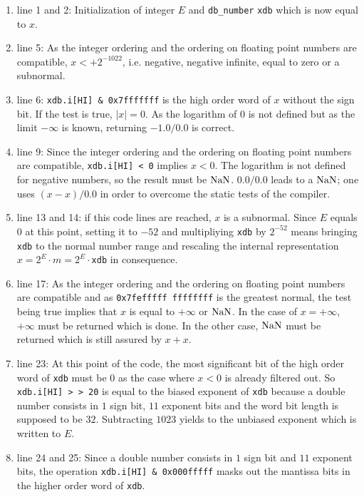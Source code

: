 {\renewcommand{\labelenumi}{}
\begin{enumerate}
\item line 1 and 2: Initialization of integer $E$ and {\tt db\_number} {\tt xdb} which is now equal to $x$.
\item line 5: As the integer ordering and the ordering on floating point numbers are compatible, 
$x < +2^{-1022}$, i.e. negative, negative infinite, equal to zero or a subnormal. 
\item line 6: {\tt xdb.i[HI] \& 0x7fffffff} is the high order word of $x$ without the sign bit. If the test is true,
$\left \vert x \right \vert = 0$. As the logarithm of $0$ is not defined but as the limit $-\infty$ is known, returning
$-1.0 / 0.0$ is correct.
\item line 9: Since the integer ordering and the ordering on floating point numbers are compatible, 
{\tt xdb.i[HI] < 0} implies $x < 0$. The logarithm is not defined for negative numbers, so the result must be $\mathrm{NaN}$. 
$0.0 / 0.0$ leads to a $\mathrm{NaN}$; one uses $\left(x - x\right) / 0.0$ in order to overcome the static tests of the compiler.
\item line 13 and 14: if this code lines are reached, $x$ is a subnormal. Since $E$ equals $0$ at this point, 
setting it to $-52$ and multipliying {\tt xdb} by $2^{-52}$ means bringing {\tt xdb} to the normal number range and
rescaling the internal representation $x = 2^E \cdot m = 2^E \cdot${\tt xdb} in consequence.
\item line 17: As the integer ordering and the ordering on floating point numbers are compatible and as 
{\tt 0x7fefffff ffffffff} is the greatest normal, the test being true implies that $x$ is equal to $+\infty$ or $\mathrm{NaN}$.
In the case of $x=+\infty$, $+\infty$ must be returned which is done. In the other case, $\mathrm{NaN}$ must be returned which is
still assured by $x + x$.
\item line 23: At this point of the code, the most significant bit of the high order word of {\tt xdb} must be $0$ as
the case where $x < 0$ is already filtered out. So {\tt xdb.i[HI] > > 20} is equal to the biased exponent of {\tt xdb} 
because a double number consists in $1$ sign bit, $11$ exponent bits and the word bit length is supposed to be $32$. 
Subtracting $1023$ yields to the unbiased exponent which is written to $E$.
\item line 24 and 25: Since a double number consists in $1$ sign bit and $11$ exponent bits, the operation 
{\tt xdb.i[HI] \& 0x000fffff} masks out the mantissa bits in the higher order word of {\tt xdb}. 

\end{enumerate}}
